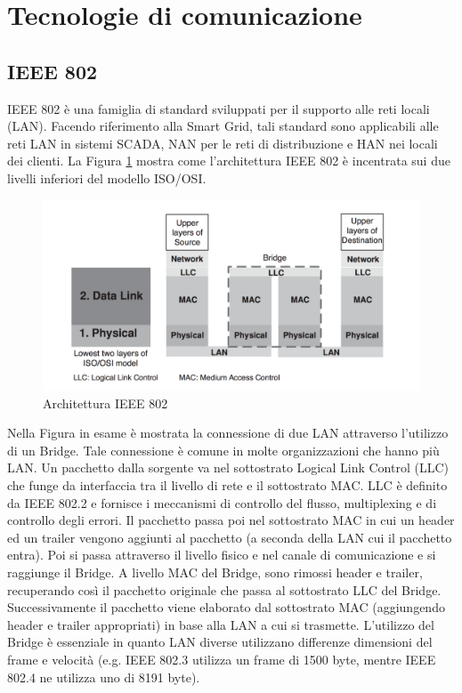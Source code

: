 \section{Tecnologie di comunicazione}
\subsection{IEEE 802}
IEEE 802 è una famiglia di standard sviluppati per il supporto alle reti locali (LAN). Facendo riferimento alla Smart Grid, tali standard sono applicabili alle reti LAN in sistemi SCADA, NAN per le reti di distribuzione e HAN nei locali dei clienti. La Figura \ref{fig:arch_802} mostra come l'architettura IEEE 802 è incentrata sui due livelli inferiori del modello ISO/OSI.
\begin{figure}[h]
	\centering
	\includegraphics[scale=0.330]{imgs/arch_ieee802.png}
	\caption{Architettura IEEE 802} \label{fig:arch_802}
\end{figure}
Nella Figura in esame è mostrata la connessione di due LAN attraverso l'utilizzo di un Bridge. Tale connessione è comune in molte organizzazioni che hanno più LAN. Un pacchetto dalla sorgente va nel sottostrato Logical Link Control (LLC) che funge da interfaccia tra il livello di rete e il sottostrato MAC. LLC è definito da IEEE 802.2 e fornisce i meccanismi di controllo del flusso, multiplexing e di controllo degli errori. Il pacchetto passa poi nel sottostrato MAC in cui un header ed un trailer vengono aggiunti al pacchetto (a seconda della LAN cui il pacchetto entra). Poi si passa attraverso il livello fisico e nel canale di comunicazione e si raggiunge il Bridge. A livello MAC del Bridge, sono rimossi header e trailer, recuperando così il pacchetto originale che passa al sottostrato LLC del Bridge. Successivamente il pacchetto viene elaborato dal sottostrato MAC (aggiungendo header e trailer appropriati) in base alla LAN a cui si trasmette. L'utilizzo del Bridge è essenziale in quanto LAN diverse utilizzano differenze dimensioni del frame e velocità (e.g. IEEE 802.3 utilizza un frame di 1500 byte, mentre IEEE 802.4 ne utilizza uno di 8191 byte\cite{802.3}).
